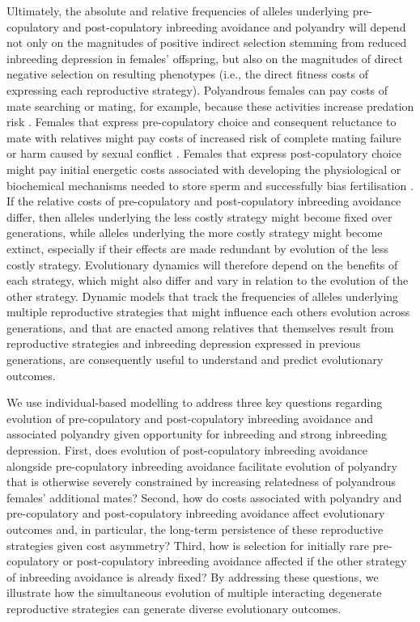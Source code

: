 \documentclass[10pt,letterpaper]{article}
\begin{document}
Ultimately, the absolute and relative frequencies of alleles underlying pre-copulatory and post-copulatory inbreeding avoidance and polyandry will depend not only on the magnitudes of positive indirect selection stemming from reduced inbreeding depression in females' offspring, but also on the magnitudes of direct negative selection on resulting phenotypes (i.e., the direct fitness costs of expressing each reproductive strategy). Polyandrous females can pay costs of mate searching or mating, for example, because these activities increase predation risk \cite[e.g.,][]{Rowe1988, Ronkainen1994, Koga1998}. Females that express pre-copulatory choice and consequent reluctance to mate with relatives might pay costs of increased risk of complete mating failure or harm caused by sexual conflict \cite[][]{Rowe1994, Kokko2013}. Females that express post-copulatory choice might pay initial energetic costs associated with developing the physiological or biochemical mechanisms needed to store sperm and successfully bias fertilisation \cite[e.g.,][]{Gasparini2011, Tuni2013, Fitzpatrick2014b}. If the relative costs of pre-copulatory and post-copulatory inbreeding avoidance differ, then alleles underlying the less costly strategy might become fixed over generations, while alleles underlying the more costly strategy might become extinct, especially if their effects are made redundant by evolution of the less costly strategy. Evolutionary dynamics will therefore depend on the benefits of each strategy, which might also differ and vary in relation to the evolution of the other strategy. Dynamic models that track the frequencies of alleles underlying multiple reproductive strategies that might influence each others evolution across generations, and that are enacted among relatives that themselves result from reproductive strategies and inbreeding depression expressed in previous generations, are consequently useful to understand and predict evolutionary outcomes.

We use individual-based modelling to address three key questions regarding evolution of pre-copulatory and post-copulatory inbreeding avoidance and associated polyandry given opportunity for inbreeding and strong inbreeding depression. First, does evolution of post-copulatory inbreeding avoidance alongside pre-copulatory inbreeding avoidance facilitate evolution of polyandry that is otherwise severely constrained by increasing relatedness of polyandrous females' additional mates? Second, how do costs associated with polyandry and pre-copulatory and post-copulatory inbreeding avoidance affect evolutionary outcomes and, in particular, the long-term persistence of these reproductive strategies given cost asymmetry? Third, how is selection for initially rare pre-copulatory or post-copulatory inbreeding avoidance affected if the other strategy of inbreeding avoidance is already fixed? By addressing these questions, we illustrate how the simultaneous evolution of multiple interacting degenerate reproductive strategies can generate diverse evolutionary outcomes. 
\end{document}
